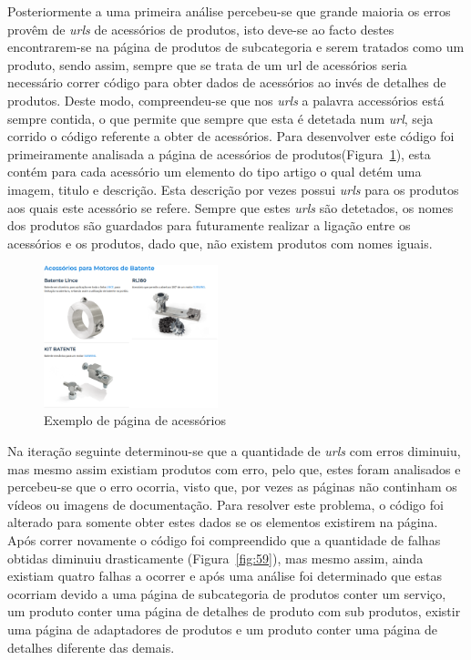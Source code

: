 Posteriormente a uma primeira análise percebeu-se que grande maioria os erros provêm de \textit{urls} de acessórios de produtos, isto deve-se ao facto destes encontrarem-se na página de produtos de subcategoria e serem tratados como um produto, sendo assim, sempre que se trata de um url de acessórios seria necessário correr código para obter dados de acessórios ao invés de detalhes de produtos. Deste modo, compreendeu-se que nos \textit{urls} a palavra accessórios está sempre contida, o que permite que sempre que esta é detetada num \textit{url}, seja corrido o código referente a obter de acessórios. Para desenvolver este código foi primeiramente analisada a página de acessórios de produtos(Figura~\ref*{fig:58}), esta contém para cada acessório um elemento do tipo artigo o qual detém uma imagem, titulo e descrição. Esta descrição por vezes possui \textit{urls} para os produtos aos quais este acessório se refere. Sempre que estes \textit{urls} são detetados, os nomes dos produtos são guardados para futuramente realizar a ligação entre os acessórios e os produtos, dado que, não existem produtos com nomes iguais. 

\begin{figure}[htb]
  \centering
  
  \includegraphics[width=0.45\textwidth]{images/implementacao/scraper/pagina_acessorios.png}
  \caption{Exemplo de página de acessórios}
  \label{fig:58}
\end{figure}

\newpage

Na iteração seguinte determinou-se que a quantidade de \textit{urls} com erros diminuiu, mas mesmo assim existiam produtos com erro, pelo que, estes foram analisados e percebeu-se que o erro ocorria, visto que, por vezes as páginas não continham os vídeos ou imagens de documentação. Para resolver este problema, o código foi alterado para somente obter estes dados se os elementos existirem na página. Após correr novamente o código foi compreendido que a quantidade de falhas obtidas diminuiu drasticamente (Figura~\ref{fig:59}), mas mesmo assim, ainda existiam quatro falhas a ocorrer e após uma análise foi determinado que estas ocorriam devido a uma página de subcategoria de produtos conter um serviço, um produto conter uma página de detalhes de produto com sub produtos, existir uma página de adaptadores de produtos e um produto conter uma página de detalhes diferente das demais.

